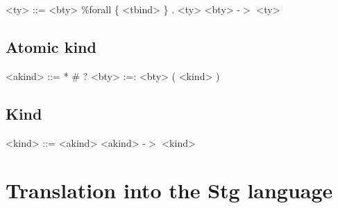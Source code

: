 \begin{grammar}
<ty> ::= <bty>
    \alt \%forall \{ <tbind> \} . <ty>
    \alt <bty> -$>$ <ty>
\end{grammar}

\subsection*{Atomic kind}

\begin{grammar}
<akind> ::= *
       \alt \#
       \alt ?
       \alt <bty> :=: <bty>
       \alt ( <kind> )
\end{grammar}

\subsection*{Kind}

\begin{grammar}
<kind> ::= <akind>
      \alt <akind> -$>$ <kind>
\end{grammar}

\section*{Translation into the Stg language}

